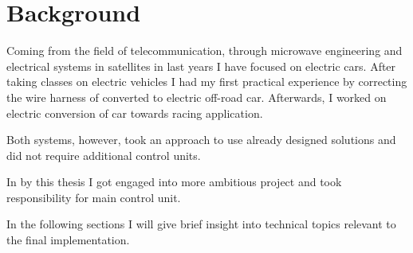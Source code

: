 









\section{Background}
Coming from the field of telecommunication, through microwave engineering and electrical systems in satellites in last years I have focused on electric cars. After taking classes on electric vehicles I had my first practical experience by correcting the wire harness of converted to electric off-road car. Afterwards, I worked on electric conversion of car towards racing application.

Both systems, however, took an approach to use already designed solutions and did not require additional control units.

In by this thesis I got engaged into more ambitious project and took responsibility for main control unit.

In the following sections I will give brief insight into technical topics relevant to the final implementation.

